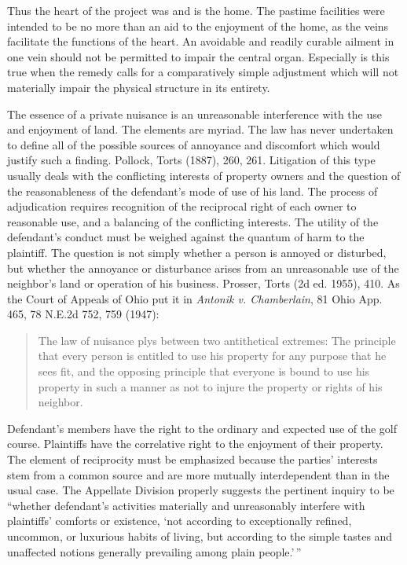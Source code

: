 Thus the heart of the project was and is the home. The pastime facilities were
intended to be no more than an aid to the enjoyment of the home, as the veins
facilitate the functions of the heart. An avoidable and readily curable ailment
in one vein should not be permitted to impair the central organ. Especially is
this true when the remedy calls for a comparatively simple adjustment which will
not materially impair the physical structure in its entirety.

The essence of a private nuisance is an unreasonable interference with the use
and enjoyment of land. The elements are myriad. The law has never undertaken to
define all of the possible sources of annoyance and discomfort which would
justify such a finding. Pollock, Torts (1887), 260, 261. Litigation of this type
usually deals with the conflicting interests of property owners and the question
of the reasonableness of the defendant's mode of use of his land. The process of
adjudication requires recognition of the reciprocal right of each owner to
reasonable use, and a balancing of the conflicting interests. The utility of the
defendant's conduct must be weighed against the quantum of harm to the
plaintiff. The question is not simply whether a person is annoyed or disturbed,
but whether the annoyance or disturbance arises from an unreasonable use of the
neighbor's land or operation of his business. Prosser, Torts (2d ed. 1955), 410.
As the Court of Appeals of Ohio put it in \emph{Antonik v. Chamberlain}, 81 Ohio
App. 465, 78 N.E.2d 752, 759 (1947):
\begin{quote}
The law of nuisance plys between two antithetical extremes: The principle
that every person is entitled to use his property for any purpose that he sees
fit, and the opposing principle that everyone is bound to use his property in
such a manner as not to injure the property or rights of his neighbor.
\end{quote}

Defendant's members have the right to the ordinary and expected use of the golf
course. Plaintiffs have the correlative right to the enjoyment of their
property. The element of reciprocity must be emphasized because the parties'
interests stem from a common source and are more mutually interdependent than in
the usual case. The Appellate Division properly suggests the pertinent inquiry
to be ``whether defendant's activities materially and unreasonably interfere
with plaintiffs' comforts or existence, `not according to exceptionally refined,
uncommon, or luxurious habits of living, but according to the simple tastes and
unaffected notions generally prevailing among plain people.'\,''

